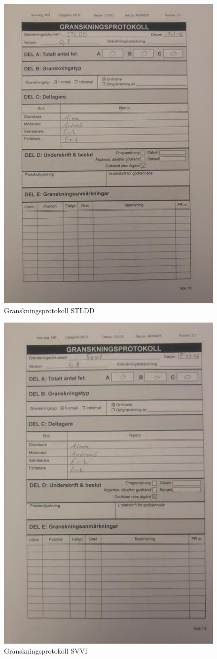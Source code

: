 \documentclass[paper=a4, fontsize=11pt,twoside]{article}
\begin{document}
\begin{figure}[h]
\centering
\includegraphics[width=0.65\linewidth]{STLDD.jpg}
\caption{Granskningsprotokoll STLDD}
\label{fig:20170322135715}
\end{figure}

\begin{figure}[h]
\centering
\includegraphics[width=0.65\linewidth]{SVVI.jpg}
\caption{Granskningsprotokoll SVVI}
\label{fig:20170322135709}
\end{figure}
\end{document}
